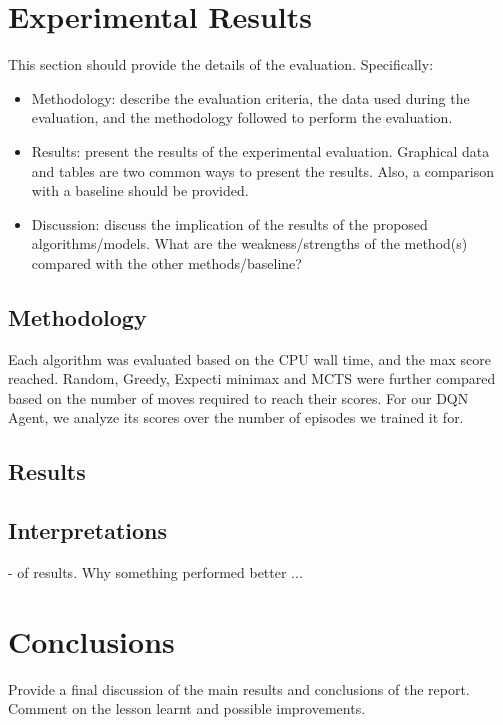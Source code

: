 \documentclass{svproc}
\begin{document}
    \section{Experimental Results}
    This section should provide the details of the evaluation. Specifically:
    \begin{itemize}
        \item Methodology: describe the evaluation criteria, the data used during the evaluation, and the methodology followed to perform the evaluation.
        \item Results: present the results of the experimental evaluation. Graphical data and tables are two common ways to present the results. Also, a comparison with a baseline should be provided.
        \item Discussion: discuss the implication of the results of the proposed algorithms/models. What are the weakness/strengths of the method(s) compared with the other methods/baseline?
    \end{itemize}

    \subsection{Methodology}
    Each algorithm was evaluated based on the CPU wall time, and the max score reached. Random, Greedy, Expecti minimax and MCTS were further compared based on the number of moves required to reach their scores. For our DQN Agent, we analyze its scores over the number of episodes we trained it for.
    \subsection{Results}

    \subsection{Interpretations}
    - of results. Why something performed better ...
    \section{Conclusions}
    Provide a final discussion of the main results and conclusions of the report. Comment on the lesson learnt and possible improvements.



    
    
\end{document}
